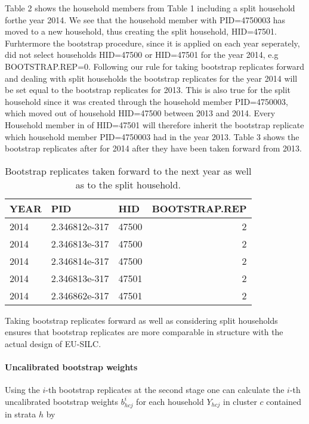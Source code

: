 \documentclass{scrartcl}
\begin{document}
Table 2 shows the household members from Table 1 including a split household forthe year 2014. We see that the household member with PID=4750003 has moved to a new household, thus creating the split household, HID=47501.
Furhtermore the bootstrap procedure, since it is applied on each year seperately, did not select households HID=47500 or HID=47501 for the year 2014, e.g BOOTSTRAP.REP=0.
Following our rule for taking bootstrap replicates forward and dealing with split households the bootstrap replicates for the year 2014 will be set equal to the bootstrap replicates for 2013. This is also true for the split household since it was created through the household member PID=4750003, which moved out of household HID=47500 between 2013 and 2014. Every Household member in of HID=47501 will therefore inherit the bootstrap replicate which household member PID=4750003 had in the year 2013. Table 3 shows the bootstrap replicates after for 2014 after they have been taken forward from 2013.

\begin{table}

\caption{\label{tab:unnamed-chunk-4}Bootstrap replicates taken forward to the next year as well as to the split household.}
\centering
\begin{tabular}[t]{lllr}
\toprule
YEAR & PID & HID & BOOTSTRAP.REP\\
\midrule
2014 & 2.346812e-317 & 47500 & 2\\
2014 & 2.346813e-317 & 47500 & 2\\
2014 & 2.346814e-317 & 47500 & 2\\
2014 & 2.346813e-317 & 47501 & 2\\
2014 & 2.346862e-317 & 47501 & 2\\
\bottomrule
\end{tabular}
\end{table}



Taking bootstrap replicates forward as well as considering split households ensures that bootstrap replicates are more comparable in structure with the actual design of EU-SILC.

\paragraph{Uncalibrated bootstrap weights}
Using the $i$-th bootstrap replicates at the second stage one can calculate the $i$-th uncalibrated bootstrap weights $b_{hcj}^{i}$ for each household $Y_{hcj}$ in cluster $c$ contained in strata $h$ by
\end{document}

